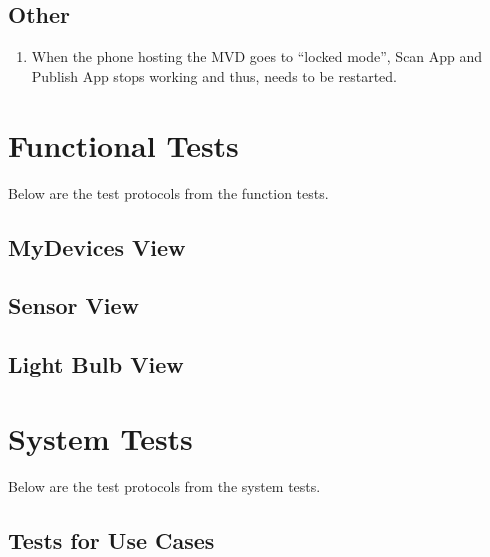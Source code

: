 \documentclass[a4paper]{article}
\begin{document}
\subsection{Other}
\begin{enumerate}
	\item When the phone hosting the MVD goes to “locked mode”, Scan App and Publish App stops working and thus, needs to be restarted.
\end{enumerate}


\clearpage
\section{Functional Tests}
Below are the test protocols from the function tests.

\subsection{MyDevices View}



\newpage

\newpage

\newpage

\subsection{Sensor View}

\newpage

\newpage

\newpage

\subsection{Light Bulb View}

\newpage

\newpage


\newpage
\section{System Tests}
Below are the test protocols from the system tests.

\subsection{Tests for Use Cases}

\newpage

\newpage

\newpage
\end{document}
